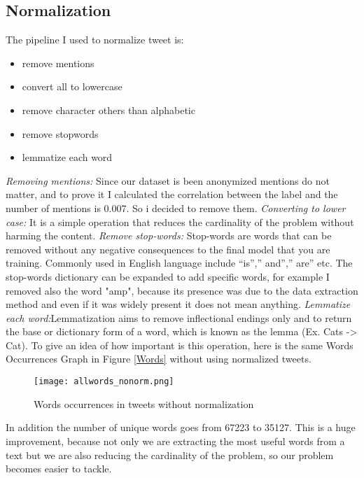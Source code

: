\documentclass[12pt]{article}
\begin{document}
\subsection{Normalization}
The pipeline I used to normalize tweet is:
\begin{itemize}
    \item remove mentions
    \item convert all to lowercase
    \item remove character others than alphabetic
    \item remove stopwords
   \item lemmatize each word
\end{itemize}
\textit{Removing mentions:} Since our dataset is been anonymized mentions do not matter, and to prove it I calculated the correlation between the label and the number of mentions is 0.007. So i decided to remove them.
\newline
\textit{Converting to lower case:} It is a simple operation that reduces the cardinality of the problem without harming the content.
\newline
\textit{Remove stop-words:} Stop-words are words that can be removed without any negative consequences to the final model that you are training. Commonly used in English language include “is”,” and”,” are” etc. The stop-words dictionary can be expanded to add specific words, for example I removed also the word "amp", because its presence was due to the data extraction method and even if it was widely present it does not mean anything.
\newline
\textit{Lemmatize each word:}Lemmatization  aims to remove inflectional endings only and to return the base or dictionary form of a word, which is known as the lemma (Ex. Cats -> Cat).
\newline
To give an idea of how important is this operation, here is the same Words Occurrences Graph in Figure \ref{Words} without using normalized tweets.
\begin{figure}[h!]
\centering
\texttt{[image: allwords\_nonorm.png]}
\caption{Words occurrences in tweets without normalization}
\end{figure}
\newline
In addition the number of unique words goes from 67223 to 35127. This is a huge improvement, because not only we are extracting the most useful words from a text but we are also reducing the cardinality of the problem, so our problem becomes easier to tackle.
\end{document}
